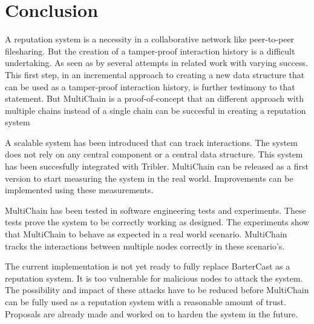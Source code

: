 \chapter{Conclusion}
A reputation system is a necessity in a collaborative network like peer-to-peer filesharing.
But the creation of a tamper-proof interaction history is a difficult undertaking.
As seen as by several attempts in related work with varying success.
This first step, in an incremental approach to creating a new data structure
that can be used as a tamper-proof interaction history, is further testimony to that statement.
But MultiChain is a proof-of-concept that an different approach with multiple chains
instead of a single chain can be succesful in creating a reputation system

A scalable system has been introduced that can track interactions.
The system does not rely on any central component or a central data structure.
This system has been succesfully integrated with Tribler.
MultiChain can be released as a first version to start measuring the system in the real world.
Improvements can be implemented using these measurements.

MultiChain has been tested in software engineering tests and experiments.
These tests prove the system to be correctly working as designed.
The experiments show that MultiChain to behave as expected in a real world scenario.
MultiChain tracks the interactions between multiple nodes correctly in these scenario's.

The current implementation is not yet ready to fully replace BarterCast as a reputation system.
It is too vulnerable for malicious nodes to attack the system.
The possibility and impact of these attacks have to be reduced
before MultiChain can be fully used as a reputation system with a reasonable amount of trust.
Proposals are already made and worked on to harden the system in the future.


